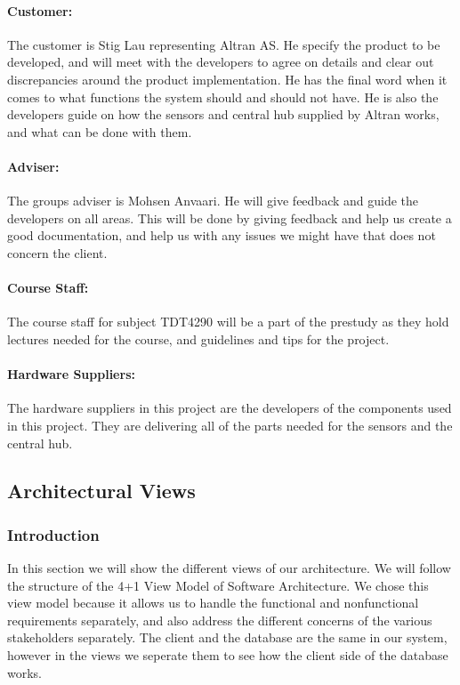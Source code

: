 \documentclass[../document.tex]{subfiles}
\begin{document}
\paragraph{Customer:} The customer is Stig Lau representing Altran AS. He specify the product to be developed, and will meet with the developers to agree on details and clear out discrepancies around the product implementation. He has the final word when it comes to what functions the system should and should not have. He is also the developers guide on how the sensors and central hub supplied by Altran works, and what can be done with them.

\paragraph{Adviser:} The groups adviser is Mohsen Anvaari. He will give feedback and guide the developers on all areas. This will be done by giving feedback and help us create a good documentation, and help us with any issues we might have that does not concern the client.

\paragraph{Course Staff:} The course staff for subject TDT4290 will be a part of the prestudy as they hold lectures needed for the course, and guidelines and tips for the project. 

\paragraph{Hardware Suppliers:} The hardware suppliers in this project are the developers of the components used in this project. They are delivering all of the parts needed for the sensors and the central hub.

\subsection{Architectural Views}
\subsubsection{Introduction}
In this section we will show the different views of our architecture. We will follow the structure of the 4+1 View Model of Software Architecture. We chose this view model because it allows us to handle the functional and nonfunctional requirements separately, and also address the different concerns of the various stakeholders separately. The client and the database are the same in our system, however in the views we seperate them to see how the client side of the database works.
\end{document}
